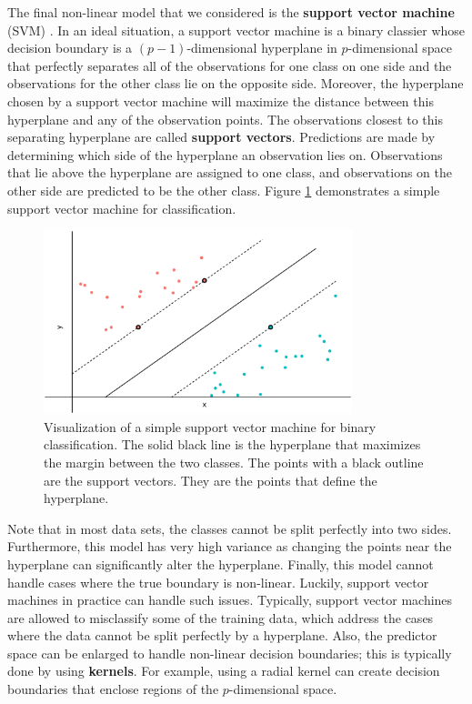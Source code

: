 \documentclass{article}
\begin{document}
The final non-linear model that we considered is the \textbf{support vector machine} (SVM) \cite{cortes1995support}. In an ideal situation, a support vector machine is a binary classier whose decision boundary is a $(p-1)$-dimensional hyperplane in $p$-dimensional space that perfectly separates all of the observations for one class on one side and the observations for the other class lie on the opposite side. Moreover, the hyperplane chosen by a support vector machine will maximize the distance between this hyperplane and any of the observation points. The observations closest to this separating hyperplane are called \textbf{support vectors}. Predictions are made by determining which side of the hyperplane an observation lies on. Observations that lie above the hyperplane are assigned to one class, and observations on the other side are predicted to be the other class. Figure \ref{fig:svm} demonstrates a simple support vector machine for classification.

\begin{figure}[t!]
	\centering
	\includegraphics[width = 0.8\textwidth]{images/svm.eps}
	\captionsetup{width = 0.8\textwidth}
	\caption{Visualization of a simple support vector machine for binary classification. The solid black line is the hyperplane that maximizes the margin between the two classes. The points with a black outline are the support vectors. They are the points that define the hyperplane.}
	\label{fig:svm}
\end{figure}

Note that in most data sets, the classes cannot be split perfectly into two sides. Furthermore, this model has very high variance as changing the points near the hyperplane can significantly alter the hyperplane. Finally, this model cannot handle cases where the true boundary is non-linear. Luckily, support vector machines in practice can handle such issues. Typically, support vector machines are allowed to misclassify some of the training data, which address the cases where the data cannot be split perfectly by a hyperplane. Also, the predictor space can be enlarged to handle non-linear decision boundaries; this is typically done by using \textbf{kernels}. For example, using a radial kernel can create decision boundaries that enclose regions of the $p$-dimensional space.
\end{document}
